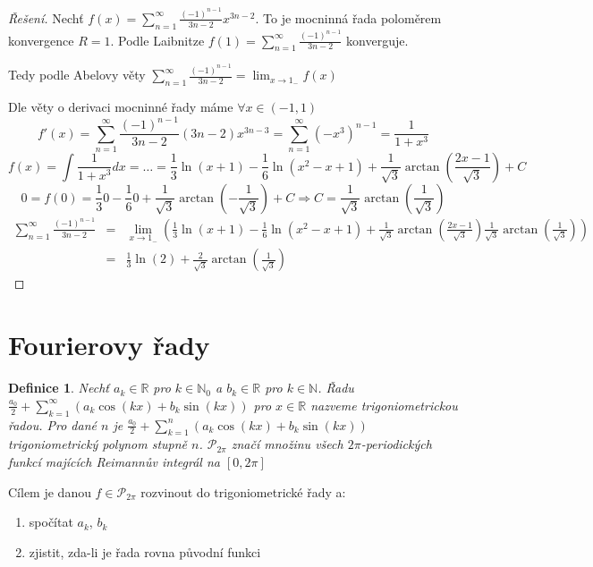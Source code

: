 \documentclass[11pt,a4paper]{article}
\newcounter{vety}
\newtheorem*{definice}{Definice}
\begin{document}
\begin{proof}[Řešení]
Nechť $f(x) = \sum_{n=1}^{\infty} \frac{(-1)^{n-1}}{3n-2} x^{3n-2}$. To je mocninná řada poloměrem konvergence $R=1$. Podle Laibnitze $f(1) = \sum_{n=1}^{\infty} \frac{(-1)^{n-1}}{3n-2}$ konverguje. 

Tedy podle Abelovy věty $\sum_{n=1}^{\infty} \frac{(-1)^{n-1}}{3n-2} = \lim_{x \rightarrow 1_-} f(x)$

Dle věty o derivaci mocninné řady máme $\forall x \in (-1, 1)$
$$f'(x) = \sum_{n=1}^{\infty} \frac{(-1)^{n-1}}{3n-2} (3n-2) x^{3n-3} = \sum_{n=1}^{\infty} \left( -x^3 \right)^{n-1} = \frac{1}{1+x^3}$$
$$f(x) = \int \frac{1}{1+x^3} dx = \ldots = \frac{1}{3} \ln(x+1) - \frac{1}{6} \ln(x^2-x+1) + \frac{1}{\sqrt{3}} \arctan \left( \frac{2x-1}{\sqrt{3}} \right) + C$$
$$0 = f(0) = \frac{1}{3} 0 - \frac{1}{6} 0 + \frac{1}{\sqrt{3}} \arctan \left( - \frac{1}{\sqrt{3}} \right) + C \Rightarrow C = \frac{1}{\sqrt{3}} \arctan \left( \frac{1}{\sqrt{3}} \right)$$
\begin{eqnarray}
\sum_{n=1}^{\infty} \frac{(-1)^{n-1}}{3n-2} & = & \lim_{x \rightarrow 1_-} \left( \frac{1}{3} \ln(x+1) - \frac{1}{6} \ln(x^2-x+1) + \frac{1}{\sqrt{3}} \arctan \left( \frac{2x-1}{\sqrt{3}} \right) \frac{1}{\sqrt{3}} \arctan \left( \frac{1}{\sqrt{3}} \right) \right) \nonumber\\
& = & \frac{1}{3} \ln(2) + \frac{2}{\sqrt{3}} \arctan \left( \frac{1}{\sqrt{3}} \right) \nonumber
\end{eqnarray}
\end{proof}

\pagebreak
\setcounter{vety}{0}
\section{Fourierovy řady}

\begin{definice}
Nechť $a_k \in \mathbb{R}$ pro $k \in \mathbb{N}_0$ a $b_k \in \mathbb{R}$ pro $k \in \mathbb{N}$. Řadu $\frac{a_0}{2} + \sum_{k=1}^{\infty} \left( a_k \cos (kx) + b_k \sin (kx) \right)$ pro $x \in \mathbb{R}$ nazveme \emph{trigoniometrickou řadou}. Pro dané $n$ je $\frac{a_0}{2} + \sum_{k=1}^{n} \left( a_k \cos (kx) + b_k \sin (kx) \right)$   \emph{trigoniometrický polynom stupně $n$}. $\mathcal{P}_{2 \pi}$ značí množinu všech $2 \pi$-periodických funkcí majících Reimannův integrál na $[0, 2 \pi]$
\end{definice}

Cílem je danou $f \in \mathcal{P}_{2 \pi}$ rozvinout do trigoniometrické řady a:
\begin{enumerate}
\item spočítat $a_k$, $b_k$
\item zjistit, zda-li je řada rovna původní funkci
\end{enumerate}
\end{document}
